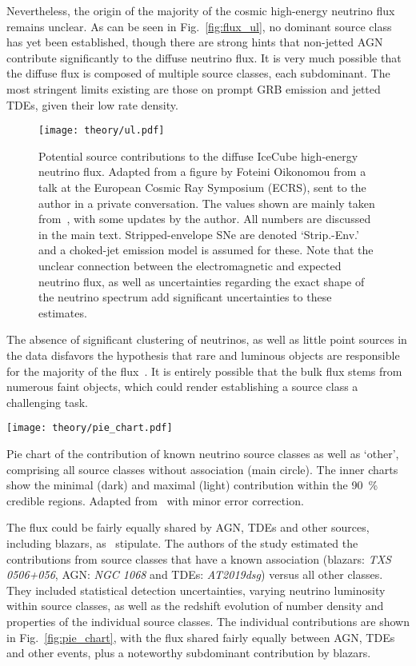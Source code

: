 Nevertheless, the origin of the majority of the cosmic high-energy neutrino flux remains unclear. As can be seen in Fig.~\ref{fig:flux_ul}, no dominant source class has yet been established, though there are strong hints that non-jetted AGN contribute significantly to the diffuse neutrino flux. It is very much possible that the diffuse flux is composed of multiple source classes, each subdominant. The most stringent limits existing are those on prompt GRB emission and jetted TDEs, given their low rate density.

\begin{figure}[htb]
  \texttt{[image: theory/ul.pdf]}
  \caption[Contribution to HE neutrino flux]{Potential source contributions to the diffuse IceCube high-energy neutrino flux. Adapted from a figure by Foteini Oikonomou from a talk at the  European Cosmic Ray Symposium (ECRS), sent to the author in a private conversation. The values shown are mainly taken from~\cite{Guepin2022}, with some updates by the author. All numbers are discussed in the main text. Stripped-envelope SNe are denoted `Strip.-Env.' and a choked-jet emission model is assumed for these. Note that the unclear connection between the electromagnetic and expected neutrino flux, as well as uncertainties regarding the exact shape of the neutrino spectrum add significant uncertainties to these estimates.}
\end{figure}

The absence of significant clustering of neutrinos, as well as little point sources in the data disfavors the hypothesis that rare and luminous objects are responsible for the majority of the flux~. It is entirely possible that the bulk flux stems from numerous faint objects, which could render establishing a source class a challenging task.

\begin{marginfigure}
  \texttt{[image: theory/pie\_chart.pdf]}
  \caption[Neutrino flux contribution pie chart]{Pie chart of the contribution of known neutrino source classes as well as `other', comprising all source classes without association (main circle). The inner charts show the minimal (dark) and maximal (light) contribution within the \SI{90}{\percent} credible regions. Adapted from~\cite{Bartos2021} with minor error correction.}
\end{marginfigure}

The flux could be fairly equally shared by AGN, TDEs and other sources, including blazars, as~ stipulate. The authors of the study estimated the contributions from source classes that have a known association (blazars: \emph{TXS 0506+056}, AGN: \emph{NGC 1068} and TDEs: \emph{AT2019dsg}) versus all other classes. They included statistical detection uncertainties, varying neutrino luminosity within source classes, as well as the redshift evolution of number density and properties of the individual source classes. The individual contributions are shown in Fig.~\ref{fig:pie_chart}, with the flux shared fairly equally between AGN, TDEs and other events, plus a noteworthy subdominant contribution by blazars.

